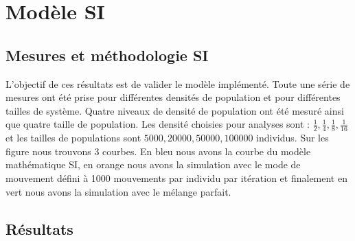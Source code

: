 \chapter{Modèle SI} \label{ch:SI}

\section{Mesures et méthodologie SI}

L'objectif de ces résultats est de valider le modèle implémenté. Toute une série de mesures ont été prise pour différentes densités de population et pour différentes tailles de système. Quatre niveaux de densité de population ont été mesuré ainsi que quatre taille de population. Les densité choisies pour analyses sont : $\frac{1}{2},\frac{1}{4},\frac{1}{8},\frac{1}{16}$ et les tailles de populations sont $5000,20000,50000,100000$ individus. Sur les figure nous trouvons $3$ courbes. En bleu nous avons la courbe du modèle mathématique SI, en orange nous avons la simulation avec le mode de mouvement défini à 1000 mouvements par individu par itération et finalement en vert nous avons la simulation avec le mélange parfait.

\newpage

\section{Résultats}

